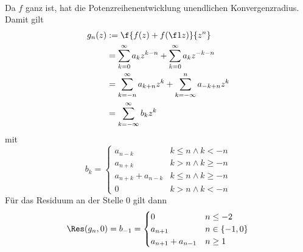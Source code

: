 \documentclass[a4paper]{scrartcl}
\begin{document}
	\begin{aufgabe}~

		Da $f$ ganz ist, hat die Potenzreihenentwicklung unendlichen Konvergenzradius.
		Damit gilt
		\begin{align*}
			g_n(z) 
			&:= \f {f(z) + f(\f 1z)}{z^n} \\
			&= \sum_{k=0}^\infty a_k z^{k-n} + \sum_{k=0}^\infty a_k z^{-k-n} \\
			&= \sum_{k=-n}^\infty a_{k+n}z^k + \sum_{k=-\infty}^n a_{-k+n} z^k \\
			&= \sum_{k=-\infty}^\infty b_k z^k
		\end{align*}
		mit
		\[
			b_k = \begin{cases}
				a_{n-k} & k \le n \land k < -n \\
				a_{n+k} & k > n \land k \ge -n \\
				a_{n+k} + a_{n-k} & k \le n \land k \ge -n \\
				0 & k > n \land k < -n
			\end{cases}
		\]
		Für das Residuum an der Stelle $0$ gilt dann
		\[
			\Res(g_n, 0) = b_{-1} = \begin{cases}
				0 & n \le -2 \\
				a_{n+1} & n \in \{-1,0\} \\
				a_{n+1} + a_{n-1} & n \ge 1
			\end{cases}
		\]


	\end{aufgabe}
\end{document}
